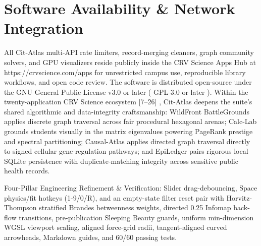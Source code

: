\documentclass[10pt,letterpaper]{article}
\begin{document}
\section{Software Availability \& Network Integration}
All Cit-Atlas multi-API rate limiters, record-merging cleaners, graph community solvers, and GPU visualizers reside publicly inside the CRV Science Apps Hub at https://crvscience.com/apps for unrestricted campus use, reproducible library workflows, and open code review. The software is distributed open-source under the GNU General Public License v3.0 or later ( GPL-3.0-or-later ). Within the twenty-application CRV Science ecosystem [7--26] , Cit-Atlas deepens the suite's shared algorithmic and data-integrity craftsmanship: WildFront BattleGrounds applies discrete graph traversal across fair procedural hexagonal arenas; Calc-Lab grounds students visually in the matrix eigenvalues powering PageRank prestige and spectral partitioning; Causal-Atlas applies directed graph traversal directly to signed cellular gene-regulation pathways; and EpiLedger pairs rigorous local SQLite persistence with duplicate-matching integrity across sensitive public health records.

Four-Pillar Engineering Refinement \& Verification: Slider drag-debouncing, Space physics/fit hotkeys (1-9/0/R), and an empty-state filter reset pair with Horvitz-Thompson stratified Brandes betweenness weights, directed 0.25 Infomap back-flow transitions, pre-publication Sleeping Beauty guards, uniform min-dimension WGSL viewport scaling, aligned force-grid radii, tangent-aligned curved arrowheads, Markdown guides, and 60/60 passing tests.
\end{document}
